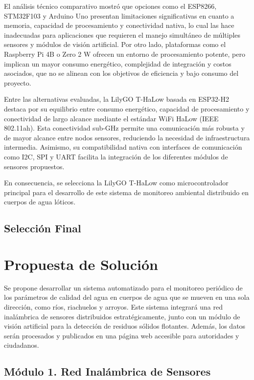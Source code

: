 El análisis técnico comparativo mostró que opciones como el ESP8266, STM32F103 y Arduino Uno presentan limitaciones significativas en cuanto a memoria, capacidad de procesamiento y conectividad nativa, lo cual las hace inadecuadas para aplicaciones que requieren el manejo simultáneo de múltiples sensores y módulos de visión artificial. Por otro lado, plataformas como el Raspberry Pi 4B o Zero 2 W ofrecen un entorno de procesamiento potente, pero implican un mayor consumo energético, complejidad de integración y costos asociados, que no se alinean con los objetivos de eficiencia y bajo consumo del proyecto.

Entre las alternativas evaluadas, la LilyGO T-HaLow basada en ESP32-H2 destaca por su equilibrio entre consumo energético, capacidad de procesamiento y conectividad de largo alcance mediante el estándar WiFi HaLow (IEEE 802.11ah). Esta conectividad sub-GHz permite una comunicación más robusta y de mayor alcance entre nodos sensores, reduciendo la necesidad de infraestructura intermedia. Asimismo, su compatibilidad nativa con interfaces de comunicación como I2C, SPI y UART facilita la integración de los diferentes módulos de sensores propuestos.

En consecuencia, se selecciona la LilyGO T-HaLow como microcontrolador principal para el desarrollo de este sistema de monitoreo ambiental distribuido en cuerpos de agua lóticos.

\subsection{Selección Final}



\section{Propuesta de Soluci\'on}

Se propone desarrollar un sistema automatizado para el monitoreo peri\'odico de los par\'ametros de calidad del agua en cuerpos de agua que se mueven en una sola direcci\'on, como r\'ios, riachuelos y arroyos. Este sistema integrar\'a una red inal\'ambrica de sensores distribuidos estrat\'egicamente, junto con un m\'odulo de visi\'on artificial para la detecci\'on de residuos s\'olidos flotantes. Adem\'as, los datos ser\'an procesados y publicados en una p\'agina web accesible para autoridades y ciudadanos.

\subsection{M\'odulo 1. Red Inal\'ambrica de Sensores}

